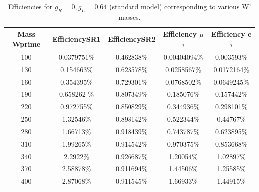 \begin{table}[htb]
  \centering
  \begin{tabular}{|ccccc|}
    \hline 
    Mass Wprime & EfficiencySR1 & EfficiencySR2 & Efficiency $\mu$$\tau$ & Efficiency e $\tau$ \\
    \hline 
    100& 0.0379751\%& 0.462838\%& 0.00404094\%& 0.003593\%\\
    130& 0.154663\%& 0.623578\%& 0.0258567\%& 0.0172164\%\\
    160& 0.354395\%& 0.729301\%& 0.0768502\%& 0.0649245\%\\
    190& 0.658262 \%& 0.807349\%& 0.185076\%& 0.157442\%\\
    220& 0.972755\%& 0.850829\%& 0.344936\%& 0.298101\%\\
    250& 1.32546\%& 0.898142\%& 0.522344\%& 0.44767\%\\ 
    280& 1.66713\%& 0.918439\%& 0.743787\%& 0.623895\%\\
    310& 1.99265\%& 0.914542\%& 0.970375\%& 0.853668\%\\
    340& 2.2922\%& 0.926687\%& 1.20054\%& 1.02897\%\\
    370& 2.58878\%& 0.911694\%& 1.44506\%& 1.25585\%\\
    400& 2.87068\%& 0.911545\%& 1.66933\%& 1.44915\%\\
    \hline
  \end{tabular}
  \caption{Efficiencies for $ g_R=0 , g_L=0.64 $ (standard model) corresponding to various W' masses. \label{eff-SM} }
\end{table}


